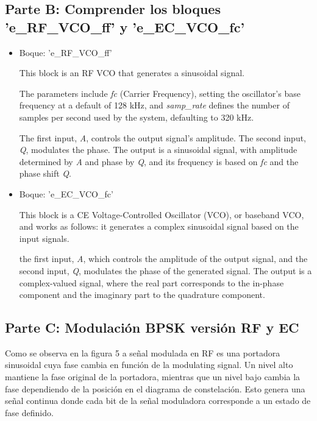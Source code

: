 \documentclass{journal}[IEEEtran, twocolumn]             %
\begin{document}
\begin{multicols}{2}
{  
\subsection{Parte B: Comprender los bloques 'e\_RF\_VCO\_ff' y 'e\_EC\_VCO\_fc'}

\begin{itemize}
 
   \item Boque: 'e\_RF\_VCO\_ff'

This block is an RF VCO that generates a sinusoidal signal.

The parameters include \textit{fc} (Carrier Frequency), setting the oscillator's base frequency at a default of 128 kHz, and \textit{samp\_rate} defines the number of samples per second used by the system, defaulting to 320 kHz.
  
The first input, \textit{A}, controls the output signal's amplitude. The second input, \textit{Q}, modulates the phase. The output is a sinusoidal signal, with amplitude determined by \textit{A} and phase by \textit{Q}, and its frequency is based on \textit{fc} and the phase shift \textit{Q}.

    \item Boque: 'e\_EC\_VCO\_fc'

This block is a CE Voltage-Controlled Oscillator (VCO), or baseband VCO, and works as follows: it generates a complex sinusoidal signal based on the input signals. 

the first input, \textit{A}, which controls the amplitude of the output signal, and the second input, \textit{Q}, modulates the phase of the generated signal. The output is a complex-valued signal, where the real part corresponds to the in-phase component and the imaginary part to the quadrature component.
 
\end{itemize}

\subsection{Parte C: Modulación BPSK versión RF y EC}

Como se observa en la figura 5 a señal modulada en RF es una portadora sinusoidal cuya fase cambia en función de la modulating signal. Un nivel alto mantiene la fase original de la portadora, mientras que un nivel bajo cambia la fase dependiendo de la posición en el diagrama de constelación. Esto genera una señal continua donde cada bit de la señal moduladora corresponde a un estado de fase definido.

}
\end{multicols}
\end{document}

